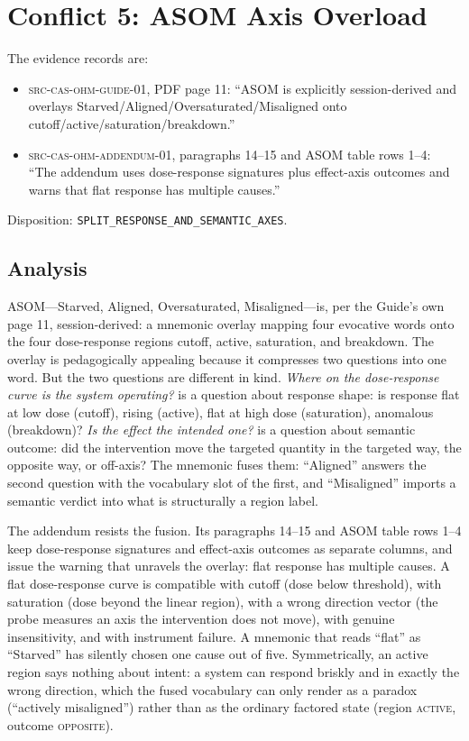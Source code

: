 \section{Conflict 5: ASOM Axis Overload}\label{ch04:asom}

\begin{conflict}\label{ch04:conf:asom}
The evidence records are:
\begin{itemize}
\item \textsc{src-cas-ohm-guide-01}, PDF page 11: ``ASOM is explicitly
session-derived and overlays Starved/Aligned/Oversaturated/Misaligned onto
cutoff/active/saturation/breakdown.''
\item \textsc{src-cas-ohm-addendum-01}, paragraphs 14--15 and ASOM table rows
1--4: ``The addendum uses dose-response signatures plus effect-axis outcomes
and warns that flat response has multiple causes.''
\end{itemize}
Disposition: \texttt{SPLIT\_RESPONSE\_AND\_SEMANTIC\_AXES}.
\end{conflict}

\subsection{Analysis}

ASOM---Starved, Aligned, Oversaturated, Misaligned---is, per the Guide's own
page 11, session-derived: a mnemonic overlay mapping four evocative words
onto the four dose-response regions cutoff, active, saturation, and
breakdown. The overlay is pedagogically appealing because it compresses two
questions into one word. But the two questions are different in kind.
\emph{Where on the dose-response curve is the system operating?} is a
question about response shape: is response flat at low dose (cutoff), rising
(active), flat at high dose (saturation), anomalous (breakdown)?
\emph{Is the effect the intended one?} is a question about semantic outcome:
did the intervention move the targeted quantity in the targeted way, the
opposite way, or off-axis? The mnemonic fuses them: ``Aligned'' answers the
second question with the vocabulary slot of the first, and ``Misaligned''
imports a semantic verdict into what is structurally a region label.

The addendum resists the fusion. Its paragraphs 14--15 and ASOM table rows
1--4 keep dose-response signatures and effect-axis outcomes as separate
columns, and issue the warning that unravels the overlay: flat response has
multiple causes. A flat dose-response curve is compatible with cutoff (dose
below threshold), with saturation (dose beyond the linear region), with a
wrong direction vector (the probe measures an axis the intervention does not
move), with genuine insensitivity, and with instrument failure. A mnemonic
that reads ``flat'' as ``Starved'' has silently chosen one cause out of five.
Symmetrically, an active region says nothing about intent: a system can
respond briskly and in exactly the wrong direction, which the fused
vocabulary can only render as a paradox (``actively misaligned'') rather than
as the ordinary factored state (region \textsc{active}, outcome
\textsc{opposite}).

